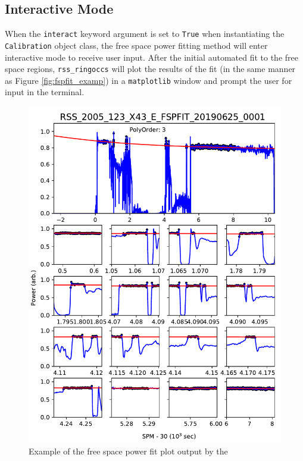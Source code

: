 \documentclass[titlepage, 12pt]{article}
\begin{document}
\begin{appendix}
    \section{Interactive Mode}
        \label{app:interact}
        When the \texttt{interact} keyword argument is set to
        \texttt{True} when instantiating the \texttt{Calibration} object class,
        the free space power fitting method will enter interactive mode to
        receive user input. After the initial automated fit to the free space
        regions, \texttt{rss\_ringoccs} will plot the results of the fit
        (in the same manner as Figure \ref{fig:fspfit_examp}) in a
        \texttt{matplotlib} window and prompt the user for input in the terminal.
        \begin{figure}[H]
            \centering
            \includegraphics[width=\linewidth]
                {figs/REV007E_X43_FSPFIT_EXAMP.PDF}
            \caption[Example of the free space power fit]
                {Example of the free space power fit plot output by the
}
\end{figure}
\end{appendix}
\end{document}

